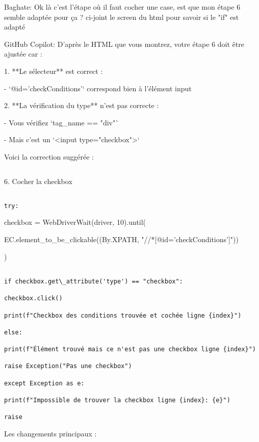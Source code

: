 Baghate: Ok là c'est l'étape où il faut cocher une case, est que mon étape 6 semble adaptée pour ça ? ci-joint le screen du html pour savoir si le "if" est adapté

GitHub Copilot: D'après le HTML que vous montrez, votre étape 6 doit être ajustée car :

1. **Le sélecteur** est correct :

- `@id='checkConditions'` correspond bien à l'élément input

2. **La vérification du type** n'est pas correcte :

- Vous vérifiez `tag\_name == "div"`

- Mais c'est un `<input type="checkbox">`

Voici la correction suggérée :

\begin{verbatim}

\end{verbatim}

  6. Cocher la checkbox

\begin{verbatim}

try:

\end{verbatim}

checkbox = WebDriverWait(driver, 10).until(

EC.element\_to\_be\_clickable((By.XPATH, "//*[@id='checkConditions']"))

)

\begin{verbatim}

if checkbox.get\_attribute('type') == "checkbox":

checkbox.click()

print(f"Checkbox des conditions trouvée et cochée ligne {index}")

else:

print(f"Élément trouvé mais ce n'est pas une checkbox ligne {index}")

raise Exception("Pas une checkbox")

except Exception as e:

print(f"Impossible de trouver la checkbox ligne {index}: {e}")

raise

\end{verbatim}

Les changements principaux :

